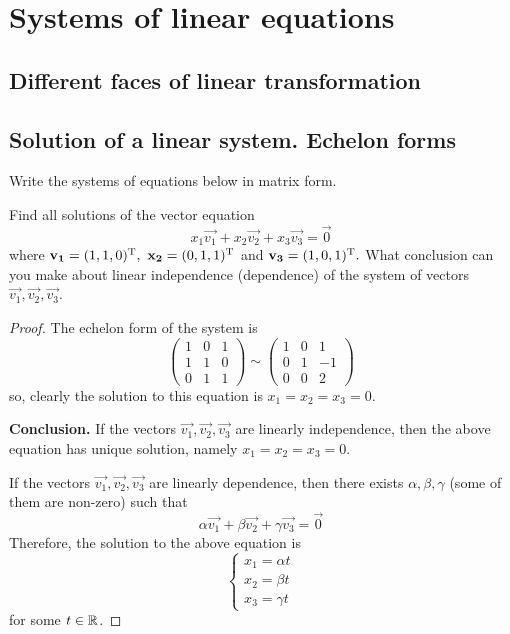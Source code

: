 

\renewcommand{\thesection}{\arabic{section}.}
\renewcommand{\theexercise}{\arabic{section}.\arabic{exercise}}
\def\by{\times}
\def\theenumi{\alph{enumi})}

\setcounter{chapter}{1}



\chapter{Systems of linear equations}

\section{Different faces of linear transformation}
\section{Solution of a linear system. Echelon forms}

\begin{exercise}
  Write the systems of equations below in matrix form.
\end{exercise}
\begin{exercise}
  Find all solutions of the vector equation
  \[x_1\vec{v_1}+x_2\vec{v_2}+x_3\vec{v_3}=\vec{0}\]
  where $\mathbf{v_1}=(1,1,0)^\mathrm{T},~\mathbf{x_2}=(0,1,1)^\mathrm{T}$ and 
  $\mathbf{v_3}=(1,0,1)^\mathrm{T}.$ What conclusion can you make about linear
  independence (dependence) of the system of vectors 
  $\vec{v_1},\vec{v_2},\vec{v_3}$.
\end{exercise}
\begin{proof}
  The echelon form of the system is
  \[
    \begin{pmatrix}
      1 &0 &1\\
      1 &1 &0\\
      0 &1 &1
    \end{pmatrix}
    \sim
    \begin{pmatrix}
      1 &0 &1\\
      0 &1 &-1\\
      0 &0 &2
    \end{pmatrix}
  \]
  so, clearly the solution to this equation is
  $x_1=x_2=x_3=0$.

  \textbf{Conclusion.} If the vectors $\vec{v_1},\vec{v_2},\vec{v_3}$
  are linearly independence, then the above equation has unique 
  solution, namely $x_1=x_2=x_3=0$.

  If the vectors $\vec{v_1},\vec{v_2},\vec{v_3}$ are linearly 
  dependence, then there exists $\alpha, \beta,\gamma$ 
  (some of them are non-zero) such that
  \[\alpha\vec{v_1}+\beta\vec{v_2}+\gamma\vec{v_3}=\vec{0}\]
  Therefore, the solution to the above equation is
  \[
    \begin{cases}
      x_1=\alpha t\\
      x_2=\beta t\\
      x_3=\gamma t
    \end{cases}
  \]
  for some $t\in\mathbb{R}$.
\end{proof}

